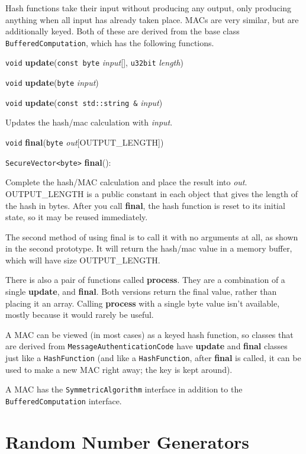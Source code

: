 \documentclass{article}
\newcommand{\function}[1]{\textbf{#1}}
\newcommand{\type}[1]{\texttt{#1}}
\renewcommand{\arg}[1]{\textsl{#1}}
\begin{document}
Hash functions take their input without producing any output, only producing
anything when all input has already taken place. MACs are very similar, but are
additionally keyed. Both of these are derived from the base class
\type{BufferedComputation}, which has the following functions.

\noindent
\type{void} \function{update}(\type{const byte} \arg{input}[], \type{u32bit}
\arg{length})

\noindent
\type{void} \function{update}(\type{byte} \arg{input})

\noindent
\type{void} \function{update}(\type{const std::string \&} \arg{input})

Updates the hash/mac calculation with \arg{input}.

\noindent
\type{void} \function{final}(\type{byte} \arg{out}[OUTPUT\_LENGTH])

\noindent
\type{SecureVector<byte>} \function{final}():

Complete the hash/MAC calculation and place the result into \arg{out}.
OUTPUT\_LENGTH is a public constant in each object that gives the length of the
hash in bytes. After you call \function{final}, the hash function is reset to
its initial state, so it may be reused immediately.

The second method of using final is to call it with no arguments at all, as
shown in the second prototype. It will return the hash/mac value in a memory
buffer, which will have size OUTPUT\_LENGTH.

There is also a pair of functions called \function{process}. They are
a combination of a single \function{update}, and \function{final}.
Both versions return the final value, rather than placing it an
array. Calling \function{process} with a single byte value isn't
available, mostly because it would rarely be useful.

A MAC can be viewed (in most cases) as a keyed hash function, so
classes that are derived from \type{MessageAuthenticationCode} have
\function{update} and \function{final} classes just like a
\type{HashFunction} (and like a \type{HashFunction}, after
\function{final} is called, it can be used to make a new MAC right
away; the key is kept around).

A MAC has the \type{SymmetricAlgorithm} interface in addition to the
\type{BufferedComputation} interface.

\section{Random Number Generators}
\end{document}
